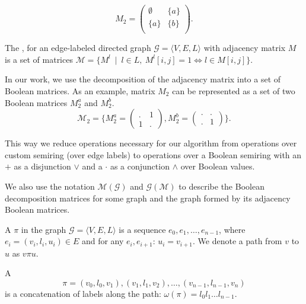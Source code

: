 $$
    M_2 =
    \begin{pmatrix}
    \emptyset & \{a\}     \\
   \{a\}   &   \{b\}     \\
    \end{pmatrix}.
$$

\begin{definition}
The ,
for an edge-labeled directed graph $\mathcal{G} =
\langle V,E,L \rangle$ with adjacency matrix $M$ is a set of matrices $\mathcal{M} = \{ M^l~\mid~l \in L, \ M^l[i,j] = 1 \iff l \in M[i,j]\}$.
\end{definition}

In our work, we use the decomposition of the adjacency matrix into a set of Boolean matrices. As an example, matrix $M_2$ can be represented as a set of two Boolean matrices $M_2^a$ and $M_2^b$.
$$
\mathcal{M}_2 =\bigg\{
M_2^{a} =
\begin{pmatrix}
    . & 1     \\
    1 & .
\end{pmatrix},
M_2^{b} =
\begin{pmatrix}
    . & .    \\
    . & 1
\end{pmatrix}
\bigg\}.
$$

This way we reduce operations necessary for our algorithm from
operations over custom semiring (over edge labels) to operations over a Boolean semiring with an  $+$ as a disjunction $\lor$ and a  $\cdot$ as a conjunction $\land$ over Boolean values.

We also use the notation $\mathcal{M}(\mathcal{G})$ and $\mathcal{G}(\mathcal{M})$ to describe the Boolean decomposition matrices for some graph and the graph formed by its adjacency Boolean matrices.

\begin{definition}
A  $\pi$ in the graph $\mathcal{G} = \langle V,E,L \rangle$ is a sequence $e_0,e_1,\ldots,e_{n-1}$, where $e_i = (v_i,l_i,u_i) \in E$ and for any $e_i, e_{i+1}$: $u_i = v_{i+1}$. We denote a path from $v$ to $u$ as $v\pi u$.
\end{definition}

\begin{definition}
A  $$\pi = (v_0,l_0,v_1),(v_1,l_1,v_2),\ldots,(v_{n-1},l_{n-1},v_n)$$ is a concatenation of labels along the path: $\omega(\pi) = l_0 l_1 \ldots l_{n-1}$.
\end{definition}


